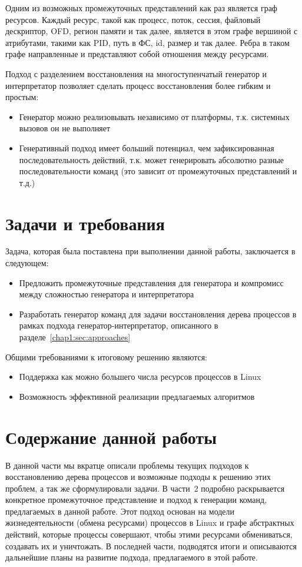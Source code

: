 Одним из возможных промежуточных представлений как раз является граф ресурсов. Каждый ресурс, такой как процесс, поток, сессия, файловый дескриптор, OFD, регион памяти и так далее, является в этом графе вершиной с атрибутами, такими как PID, путь в ФС, id, размер и так далее. Ребра в таком графе направленные и представляют собой отношения между ресурсами.

Подход с разделением восстановления на многоступенчатый генератор и интерпретатор позволяет сделать процесс восстановления более гибким и простым:
\begin{itemize}
	\item Генератор можно реализовывать независимо от платформы, т.к. системных вызовов он не выполняет
	\item Генеративный подход имеет больший потенциал, чем зафиксированная последовательность действий, т.к. может генерировать абсолютно разные последовательности команд (это зависит от промежуточных представлений и т.д.)
\end{itemize}

\section{Задачи и требования}

Задача, которая была поставлена при выполнении данной работы, заключается в следующем:

\begin{itemize}
	\item Предложить промежуточные представления для генератора и компромисс между сложностью генератора и интерпретатора
	\item Разработать генератор команд для задачи восстановления дерева процессов в рамках подхода генератор-интерпретатор, описанного в разделе~\ref{chap1:sec:approaches}
\end{itemize}

Общими требованиями к итоговому решению являются:
\begin{itemize}
	\item Поддержка как можно большего числа ресурсов процессов в Linux
	\item Возможность эффективной реализации предлагаемых алгоритмов
\end{itemize}


\section{Содержание данной работы}

В данной части мы вкратце описали проблемы текущих подходов к восстановлению дерева процессов и возможные подходы к решению этих проблем, а так же сформулировали задачи. В части~2 подробно раскрывается конкретное промежуточное представление и подход к генерации команд, предлагаемых в данной работе. Этот подход основан на модели жизнедеятельности (обмена ресурсами) процессов в Linux и графе абстрактных действий, которые процессы совершают, чтобы этими ресурсами обмениваться, создавать их и уничтожать. В последней части, подводятся итоги и описываются дальнейшие планы на развитие подхода, предлагаемого в этой работе.
